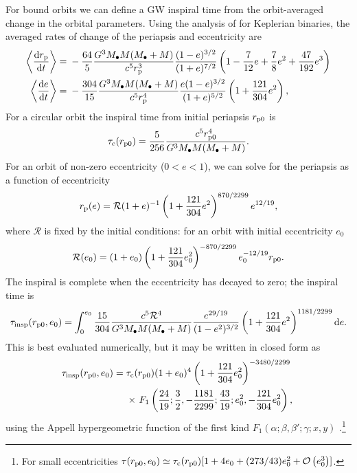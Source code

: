 For bound orbits we can define a GW inspiral time from the orbit-averaged change in the orbital parameters. Using the analysis of \citet{Peters1964} for Keplerian binaries, the averaged rates of change of the periapsis and eccentricity are
\begin{align}
\left\langle\dfrac{\mathrm{d} {r_\mathrm{p}}}{\mathrm{d} {t}}\right\rangle = {} & -\dfrac{64}{5}\dfrac{G^3M_\bullet M(M_\bullet + M)}{c^5r_\mathrm{p}^3}\dfrac{(1 - e)^{3/2}}{(1 + e)^{7/2}}\left(1 - \dfrac{7}{12}e + \dfrac{7}{8}e^2 + \dfrac{47}{192}e^3\right) \\
\left\langle\dfrac{\mathrm{d} {e}}{\mathrm{d} {t}}\right\rangle = {} & -\dfrac{304}{15}\dfrac{G^3M_\bullet M(M_\bullet + M)}{c^5r_\mathrm{p}^4}\dfrac{e(1 - e)^{3/2}}{(1 + e)^{5/2}}\left(1 + \dfrac{121}{304}e^2\right),
\end{align}
For a circular orbit the inspiral time from initial periapsis $r_\mathrm{p0}$ is
\begin{equation}
\tau_\mathrm{c}(r_\mathrm{p0}) = \dfrac{5}{256}\dfrac{c^5r_\mathrm{p0}^4}{G^3M_\bullet M(M_\bullet + M)}.
\end{equation}
For an orbit of non-zero eccentricity ($0 < e < 1$), we can solve for the periapsis as a function of eccentricity
\begin{equation}
r_\mathrm{p}(e) = \mathcal{R}(1 + e)^{-1}\left(1 + \dfrac{121}{304}e^2\right)^{870/2299}e^{12/19},
\end{equation}
where $\mathcal{R}$ is fixed by the initial conditions: for an orbit with initial eccentricity $e_0$
\begin{equation}
\mathcal{R}(e_0) = (1 + e_0)\left(1 + \dfrac{121}{304}e_0^2\right)^{-870/2299}e_0^{-12/19}r_\mathrm{p0}.
\end{equation}
The inspiral is complete when the eccentricity has decayed to zero; the inspiral time is \citep{Peters1964}
\begin{equation}
\tau_\mathrm{insp}(r_\mathrm{p0},e_0) = \int_{0}^{e_0}{\dfrac{15}{304}\dfrac{c^5\mathcal{R}^4}{G^3M_\bullet M(M_\bullet + M)}\dfrac{e^{29/19}}{(1-e^2)^{3/2}}\left(1 + \dfrac{121}{304}e^2\right)^{1181/2299}}\,\mathrm{d}{e}.
\end{equation}
This is best evaluated numerically, but it may be written in closed form as
\begin{align}
\tau_\mathrm{insp}(r_\mathrm{p0},e_0) = {} & \tau_\mathrm{c}(r_\mathrm{p0})(1 + e_0)^4\left(1 + \dfrac{121}{304}e_0^2\right)^{-3480/2299} \nonumber \\* 
 {} & \times \left. F_1\left(\dfrac{24}{19};\dfrac{3}{2},-\dfrac{1181}{2299};\dfrac{43}{19};e_0^2,-\dfrac{121}{304}e_0^2\right),\right.
\label{eq:Bound_inspiral}
\end{align}
using the Appell hypergeometric function of the first kind $F_1(\alpha;\beta,\beta';\gamma;x,y)$ \citep[16.15.1]{Olver2010}.\footnote{For small eccentricities $\tau(r_\mathrm{p0},e_0) \simeq \tau_\mathrm{c}(r_\mathrm{p0})[1 + 4e_0 + (273/43)e_0^2 + \mathcal{O}\left({e_0^3}\right)]$.}

